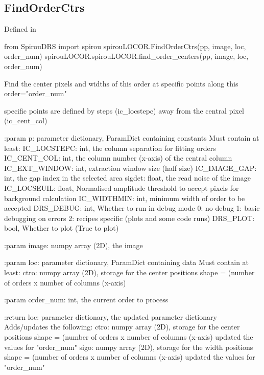 \begin{minipage}{\textwidth}
\subsection{FindOrderCtrs}

Defined in \spirouLOCOR{}

\begin{pythonbox}
from SpirouDRS import spirou
spirouLOCOR.FindOrderCtrs(pp, image, loc, order_num)
spirouLOCOR.spirouLOCOR.find_order_centers(pp, image, loc, order_num)
\end{pythonbox}

\begin{pythondocstring}
Find the center pixels and widths of this order at specific points
along this order="order_num"

specific points are defined by steps (ic_locstepc) away from the
central pixel (ic_cent_col)

:param p: parameter dictionary, ParamDict containing constants
    Must contain at least:
            IC_LOCSTEPC: int, the column separation for fitting orders
            IC_CENT_COL: int, the column number (x-axis) of the central
                         column
            IC_EXT_WINDOW: int, extraction window size (half size)
            IC_IMAGE_GAP: int, the gap index in the selected area
            sigdet: float, the read noise of the image
            IC_LOCSEUIL: float, Normalised amplitude threshold to accept
                         pixels for background calculation
            IC_WIDTHMIN: int, minimum width of order to be accepted
            DRS_DEBUG: int, Whether to run in debug mode
                            0: no debug
                            1: basic debugging on errors
                            2: recipes specific (plots and some code runs)
            DRS_PLOT: bool, Whether to plot (True to plot)

:param image: numpy array (2D), the image

:param loc: parameter dictionary, ParamDict containing data
        Must contain at least:
            ctro: numpy array (2D), storage for the center positions
                  shape = (number of orders x number of columns (x-axis)

:param order_num: int, the current order to process

:return loc: parameter dictionary, the updated parameter dictionary
        Adds/updates the following:
            ctro: numpy array (2D), storage for the center positions
                  shape = (number of orders x number of columns (x-axis)
                  updated the values for "order_num"
            sigo: numpy array (2D), storage for the width positions
                  shape = (number of orders x number of columns (x-axis)
                  updated the values for "order_num"
\end{pythondocstring}
\end{minipage}

